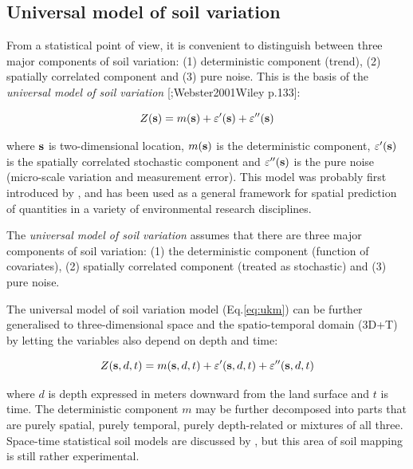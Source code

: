 \documentclass[11pt]{krantz}
\makeatletter
\newenvironment{kframe}{%
\medskip{}
\setlength{\fboxsep}{.8em}
 \def\at@end@of@kframe{}%
 \ifinner\ifhmode%
  \def\at@end@of@kframe{\end{minipage}}%
  \begin{minipage}{\columnwidth}%
 \fi\fi%
 \def\FrameCommand##1{\hskip\@totalleftmargin \hskip-\fboxsep
 \colorbox{shadecolor}{##1}\hskip-\fboxsep
     \hskip-\linewidth \hskip-\@totalleftmargin \hskip\columnwidth}%
 \MakeFramed {\advance\hsize-\width
   \@totalleftmargin\z@ \linewidth\hsize
   \@setminipage}}%
 {\par\unskip\endMakeFramed%
 \at@end@of@kframe}
\newenvironment{rmdblock}[1]
  {
  \begin{itemize}
  \renewcommand{\labelitemi}{
    \raisebox{-.7\height}[0pt][0pt]{
      {\setkeys{Gin}{width=3em,keepaspectratio}\texttt{[image: images/\#1]}}
    }
  }
  \setlength{\fboxsep}{1em}
  \begin{kframe}
  \item
  }
  {
  \end{kframe}
  \end{itemize}
  }
\newenvironment{rmdnote}
  {\begin{rmdblock}{note}}
  {\end{rmdblock}}
\theoremstyle{definition}
\theoremstyle{definition}
\theoremstyle{definition}
\theoremstyle{remark}
\makeatother
\begin{document}
\hypertarget{umsv}{%
\subsection{Universal model of soil variation}\label{umsv}}

From a statistical point of view, it is convenient to distinguish
between three major components of soil variation: (1) deterministic
component (trend), (2) spatially correlated component and (3) pure
noise. This is the basis of the \emph{universal model of soil variation}
{[}\citet{Burrough1998OUP};Webster2001Wiley p.133{]}:

\begin{equation}
Z({\bf{s}}) = m({\bf{s}}) + \varepsilon '({\bf{s}}) + \varepsilon ''({\bf{s}})
\label{eq:ukm}
\end{equation}

where \(\bf{s}\) is two-dimensional location, \(m({\bf{s}})\) is the
deterministic component, \(\varepsilon '({\bf{s}})\) is the spatially
correlated stochastic component and \(\varepsilon ''({\bf{s}})\) is the
pure noise (micro-scale variation and measurement error). This model was
probably first introduced by \citet{Matheron1969PhD}, and has been used
as a general framework for spatial prediction of quantities in a variety
of environmental research disciplines.

\begin{rmdnote}
The \emph{universal model of soil variation} assumes that there are
three major components of soil variation: (1) the deterministic
component (function of covariates), (2) spatially correlated component
(treated as stochastic) and (3) pure noise.
\end{rmdnote}

The universal model of soil variation model (Eq.\eqref{eq:ukm}) can be
further generalised to three-dimensional space and the spatio-temporal
domain (3D+T) by letting the variables also depend on depth and time:

\begin{equation}
Z({\bf{s}}, d, t) = m({\bf{s}}, d, t) + \varepsilon '({\bf{s}}, d, t) + \varepsilon ''({\bf{s}}, d, t)
\label{eq:ukm3DT}
\end{equation}

where \(d\) is depth expressed in meters downward from the land surface
and \(t\) is time. The deterministic component \(m\) may be further
decomposed into parts that are purely spatial, purely temporal, purely
depth-related or mixtures of all three. Space-time statistical soil
models are discussed by \citet{Grunwald2005CRCPress}, but this area of
soil mapping is still rather experimental.
\end{document}
